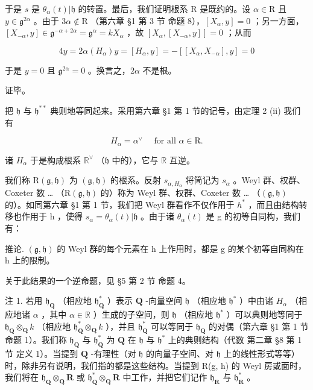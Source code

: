于是 \(s\) 是 \(\theta_{\alpha}(t)|\mathfrak{h}\) 的转置。最后，我们证明根系 R 是既约的。设 \(\alpha \in \mathrm{R}\) 且 \(y \in \mathfrak{g}^{2\alpha}\) 。由于 \(3\alpha \notin \mathrm{R}\) （第六章 §1 第 3 节 命题 8），\([X_{\alpha}, y] = 0\) ；另一方面，\([X_{-\alpha}, y] \in \mathfrak{g}^{-\alpha + 2\alpha} = \mathfrak{g}^{\alpha} = kX_{\alpha}\) ，故 \([X_{\alpha}, [X_{-\alpha}, y]] = 0\) ；从而

\[
4 y = 2 \alpha (H _ {\alpha}) y = [ H _ {\alpha}, y ] = - [ [ X _ {\alpha}, X _ {- \alpha} ], y ] = 0
\]

于是 \(y = 0\) 且 \(\mathfrak{g}^{2\alpha} = 0\) 。换言之，\(2\alpha\) 不是根。

证毕。

把 \(\mathfrak{h}\) 与 \(\mathfrak{h}^{**}\) 典则地等同起来。采用第六章 §1 第 1 节的记号，由定理 2 (ii) 我们有

\[
H _ {\alpha} = \alpha^ {\vee} \quad \text { for   all } \alpha \in \mathrm{R}.\tag{2}
\]

诸 \(H_{\alpha}\) 于是构成根系 \(\mathbb{R}^{\vee}\) （\(\mathfrak{h}\) 中的），它与 \(\mathbb{R}\) 互逆。

我们称 \(\mathrm{R}(\mathfrak{g},\mathfrak{h})\) 为 \((\mathfrak{g},\mathfrak{h})\) 的根系。反射 \(s_{\alpha,H_{\alpha}}\) 将简记为 \(s_{\alpha}\) 。Weyl 群、权群、Coxeter 数 \ldots{} （\(\mathrm{R}(\mathfrak{g},\mathfrak{h})\) 的）称为 Weyl 群、权群、Coxeter 数 \ldots{} （\((\mathfrak{g},\mathfrak{h})\) 的）。如同第六章 §1 第 1 节，我们把 Weyl 群看作不仅作用于 \(h^{*}\) ，而且由结构转移也作用于 h ，使得 \(s_{\alpha} = \theta_{\alpha}(t)|\mathfrak{h}\) 。由于诸 \(\theta_{\alpha}(t)\) 是 g 的初等自同构，我们有：

推论. \((\mathfrak{g},\mathfrak{h})\) 的 Weyl 群的每个元素在 h 上作用时，都是 g 的某个初等自同构在 h 上的限制。

关于此结果的一个逆命题，见 §5 第 2 节 命题 4。

注 1. 若用 \(\mathfrak{h}_{\mathbf{Q}}\) （相应地 \(\mathfrak{h}_{\mathbf{Q}}^{*}\) ）表示 \(\mathbf{Q}\) -向量空间 \(\mathfrak{h}\) （相应地 \(\mathfrak{h}^{*}\) ）中由诸 \(H_{\alpha}\) （相应地诸 \(\alpha\) ，其中 \(\alpha \in \mathbb{R}\) ）生成的子空间，则 \(\mathfrak{h}\) （相应地 \(\mathfrak{h}^{*}\) ）可以典则地等同于 \(\mathfrak{h}_{\mathbf{Q}} \otimes_{\mathbf{Q}} k\) （相应地 \(\mathfrak{h}_{\mathbf{Q}}^{*} \otimes_{\mathbf{Q}} k\) ），并且 \(\mathfrak{h}_{\mathbf{Q}}^{*}\) 可以等同于 \(\mathfrak{h}_{\mathbf{Q}}\) 的对偶（第六章 §1 第 1 节 命题 1）。我们称 \(\mathfrak{h}_{\mathbf{Q}}\) 与 \(\mathfrak{h}_{\mathbf{Q}}^{*}\) 为 \(\mathbf{Q}\) 在 \(\mathfrak{h}\) 与 \(\mathfrak{h}^{*}\) 上的典则结构（代数 第二章 §8 第 1 节 定义 1）。当提到 \(\mathbf{Q}\) -有理性（对 \(\mathfrak{h}\) 的向量子空间、对 \(\mathfrak{h}\) 上的线性形式等等）时，除非另有说明，我们指的都是这些结构。当提到 R(g, h) 的 Weyl 房或面时，我们将在 \(\mathfrak{h}_{\mathbf{Q}} \otimes_{\mathbf{Q}} \mathbf{R}\) 或 \(\mathfrak{h}_{\mathbf{Q}}^{*} \otimes_{\mathbf{Q}} \mathbf{R}\) 中工作，并把它们记作 \(\mathfrak{h}_{\mathbf{R}}\) 与 \(\mathfrak{h}_{\mathbf{R}}^{*}\) 。


